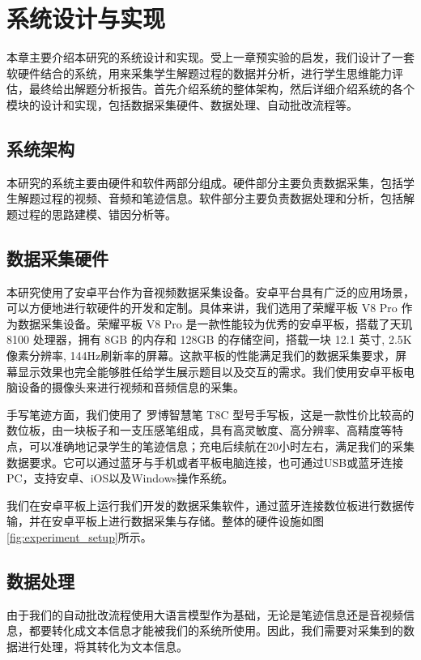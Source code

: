 
\chapter{系统设计与实现}

本章主要介绍本研究的系统设计和实现。受上一章预实验的启发，我们设计了一套软硬件结合的系统，用来采集学生解题过程的数据并分析，进行学生思维能力评估，最终给出解题分析报告。首先介绍系统的整体架构，然后详细介绍系统的各个模块的设计和实现，包括数据采集硬件、数据处理、自动批改流程等。

\section{系统架构}

本研究的系统主要由硬件和软件两部分组成。硬件部分主要负责数据采集，包括学生解题过程的视频、音频和笔迹信息。软件部分主要负责数据处理和分析，包括解题过程的思路建模、错因分析等。

\section{数据采集硬件}

本研究使用了安卓平台作为音视频数据采集设备。安卓平台具有广泛的应用场景，可以方便地进行软硬件的开发和定制。具体来讲，我们选用了荣耀平板 V8 Pro 作为数据采集设备。荣耀平板 V8 Pro 是一款性能较为优秀的安卓平板，搭载了天玑 8100 处理器，拥有 8GB 的内存和 128GB 的存储空间，搭载一块 12.1 英寸, 2.5K 像素分辨率, 144Hz刷新率的屏幕。这款平板的性能满足我们的数据采集要求，屏幕显示效果也完全能够胜任给学生展示题目以及交互的需求。我们使用安卓平板电脑设备的摄像头来进行视频和音频信息的采集。

手写笔迹方面，我们使用了 罗博智慧笔 T8C 型号手写板，这是一款性价比较高的数位板，由一块板子和一支压感笔组成，具有高灵敏度、高分辨率、高精度等特点，可以准确地记录学生的笔迹信息；充电后续航在20小时左右，满足我们的采集数据要求。它可以通过蓝牙与手机或者平板电脑连接，也可通过USB或蓝牙连接PC，支持安卓、iOS以及Windows操作系统。

我们在安卓平板上运行我们开发的数据采集软件，通过蓝牙连接数位板进行数据传输，并在安卓平板上进行数据采集与存储。整体的硬件设施如图\ref{fig:experiment_setup}所示。

\section{数据处理}

由于我们的自动批改流程使用大语言模型作为基础，无论是笔迹信息还是音视频信息，都要转化成文本信息才能被我们的系统所使用。因此，我们需要对采集到的数据进行处理，将其转化为文本信息。

